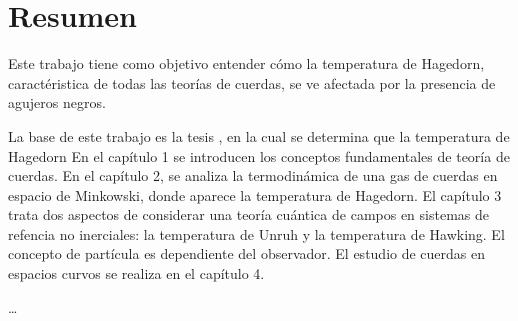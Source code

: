 \chapter*{Resumen}

Este trabajo tiene como objetivo entender cómo la temperatura de Hagedorn, 
caractéristica de todas las teorías de cuerdas, se ve afectada por la presencia de agujeros
negros.

La base de este trabajo es la tesis \cite{Mertens2015}, en la cual se determina que la temperatura
de Hagedorn 
En el capítulo 1 se introducen los conceptos fundamentales de teoría de cuerdas.
En el capítulo 2, se analiza la termodinámica de una gas de cuerdas en
espacio de Minkowski, donde aparece la temperatura de Hagedorn.
El capítulo 3 trata dos aspectos de considerar una teoría cuántica de campos en 
sistemas de refencia no inerciales: la temperatura de Unruh y la temperatura de Hawking.
El concepto de partícula es dependiente del observador.
El estudio de cuerdas en espacios curvos se realiza en el capítulo 4. 



\ldots

